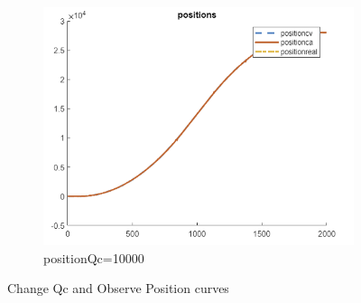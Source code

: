 \begin{figure}[H]
\begin{subfigure}[b]{0.3\textwidth}
        \includegraphics[width=\textwidth]{images/positionQc=10000.png}
        \caption{positionQc=10000}
        \label{fig:positionQc=10000}
    \end{subfigure}
    \caption{Change Qc and Observe Position curves}
    \label{21}
\end{figure}

